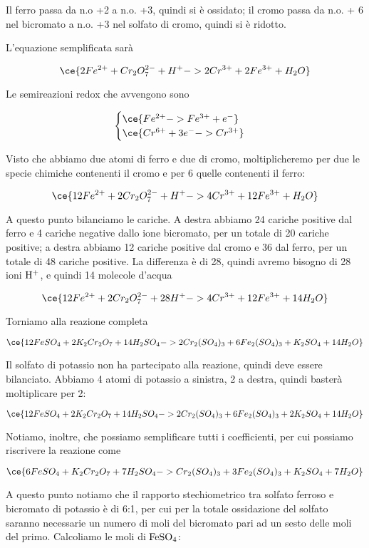 Il ferro passa da n.o +2 a n.o. +3, quindi si è ossidato; il cromo passa da n.o. + 6 nel bicromato a n.o. +3 nel solfato di cromo, quindi si è ridotto.

L'equazione semplificata sarà

$$\ce{2Fe^{2+} + Cr_2O_7^{2-} + H^+ -> 2Cr^{3+} + 2Fe^{3+} + H_2O}$$

Le semireazioni redox che avvengono sono

$$\begin{cases}
    \ce{Fe^{2+} -> Fe^{3+} + e^-}\\
    \ce{Cr^{6+} + 3e^- -> Cr^{3+}}
\end{cases}$$

Visto che abbiamo due atomi di ferro e due di cromo, moltiplicheremo per due le specie chimiche contenenti il cromo e per 6 quelle contenenti il ferro:

$$\ce{12Fe^{2+} + 2Cr_2O_7^{2-} + H^+ -> 4Cr^{3+} + 12Fe^{3+} + H_2O}$$

A questo punto bilanciamo le cariche. A destra abbiamo 24 cariche positive dal ferro e 4 cariche negative dallo ione bicromato, per un totale di 20 cariche positive; a destra abbiamo 12 cariche positive dal cromo e 36 dal ferro, per un totale di 48 cariche positive. La differenza è di 28, quindi avremo bisogno di 28 ioni $\rm H^+$, e quindi 14 molecole d'acqua

$$\ce{12Fe^{2+} + 2Cr_2O_7^{2-} + 28H^+ -> 4Cr^{3+} + 12Fe^{3+} + 14H_2O}$$

Torniamo alla reazione completa

$$\ce{12FeSO_4 + 2K_2Cr_2O_7 + 14H_2SO_4 -> 2Cr_2(SO_4)_3 + 6Fe_2(SO_4)_3 + K_2SO_4 + 14H_2O}$$

Il solfato di potassio non ha partecipato alla reazione, quindi deve essere bilanciato. Abbiamo 4 atomi di potassio a sinistra, 2 a destra, quindi basterà moltiplicare per 2:

$$\ce{12FeSO_4 + 2K_2Cr_2O_7 + 14H_2SO_4 -> 2Cr_2(SO_4)_3 + 6Fe_2(SO_4)_3 + 2K_2SO_4 + 14H_2O}$$

Notiamo, inoltre, che possiamo semplificare tutti i coefficienti, per cui possiamo riscrivere la reazione come

$$\ce{6FeSO_4 + K_2Cr_2O_7 + 7H_2SO_4 -> Cr_2(SO_4)_3 + 3Fe_2(SO_4)_3 + K_2SO_4 + 7H_2O}$$

A questo punto notiamo che il rapporto stechiometrico tra solfato ferroso e bicromato di potassio è di 6:1, per cui per la totale ossidazione del solfato saranno necessarie un numero di moli del bicromato pari ad un sesto delle moli del primo. Calcoliamo le moli di $\rm FeSO_4$:

